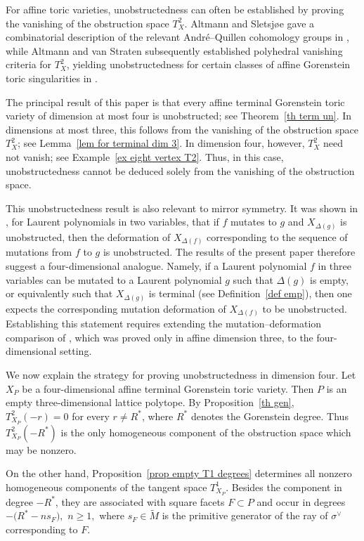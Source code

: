 \documentclass[11pt]{amsart}
\numberwithin{equation}{section}
\theoremstyle{plain}
\theoremstyle{definition}
\newcommand{\0}{$0$-mutable}
\renewcommand{\1}{$1$-rigid}
\renewcommand{\0}{$0$-mutable}
\newcommand{\newt}{\Delta}
\begin{document}
For affine toric varieties, unobstructedness can often be established by proving the vanishing of the obstruction space \(T^2_X\). Altmann and Sletsj{\o}e gave a combinatorial description of the relevant Andr\'e--Quillen cohomology groups in \cite{AS98}, while Altmann and van Straten subsequently established polyhedral vanishing criteria for \(T^2_X\), yielding unobstructedness for certain classes of affine Gorenstein toric singularities in \cite{AvS00}. 

The principal result of this paper is that every affine terminal Gorenstein toric variety of dimension at most four is unobstructed; see Theorem~\ref{th term un}. In dimensions at most three, this follows from the vanishing of the obstruction space \(T_X^2\); see Lemma~\ref{lem for terminal dim 3}. In dimension four, however, \(T_X^2\) need not vanish; see Example~\ref{ex eight vertex T2}. Thus, in this case, unobstructedness cannot be deduced solely from the vanishing of the obstruction space.

This unobstructedness result is also relevant to mirror symmetry. It was shown in \cite{Fil26}, for Laurent polynomials in two variables, that if $f$ mutates to $g$ and \(X_{\newt(g)}\) is unobstructed, then the deformation of \(X_{\newt(f)}\) corresponding to the sequence of mutations from \(f\) to \(g\) is unobstructed. The results of the present paper therefore suggest a four-dimensional analogue. Namely, if a Laurent polynomial \(f\) in three variables can be mutated to a Laurent polynomial \(g\) such that \(\newt(g)\) is empty, or equivalently such that \(X_{\newt(g)}\) is terminal (see Definition~\ref{def emp}), then one expects the corresponding mutation deformation of \(X_{\newt(f)}\) to be unobstructed. Establishing this statement requires extending the mutation--deformation comparison of \cite{Fil26}, which was proved only in affine dimension three, to the four-dimensional setting.


We now explain the strategy for proving unobstructedness in dimension four. Let \(X_P\) be a four-dimensional affine terminal Gorenstein toric variety. Then \(P\) is an empty three-dimensional lattice polytope. By Proposition~\ref{th gen},
$
T^2_{X_P}(-r)=0
$
for every \(r\neq R^*\), where \(R^*\) denotes the Gorenstein degree. Thus \(T^2_{X_P}(-R^*)\) is the only homogeneous component of the obstruction space which may be nonzero.

On the other hand, Proposition~\ref{prop empty T1 degrees} determines all nonzero homogeneous components of the tangent space \(T^1_{X_P}\). Besides the component in degree \(-R^*\), they are associated with square facets \(F\subset P\) and occur in degrees
$
-\bigl(R^*-ns_F\bigr),$  $n\geq 1,$
where \(s_F\in\widetilde M\) is the primitive generator of the ray of \(\sigma^\vee\) corresponding to \(F\).
\end{document}
